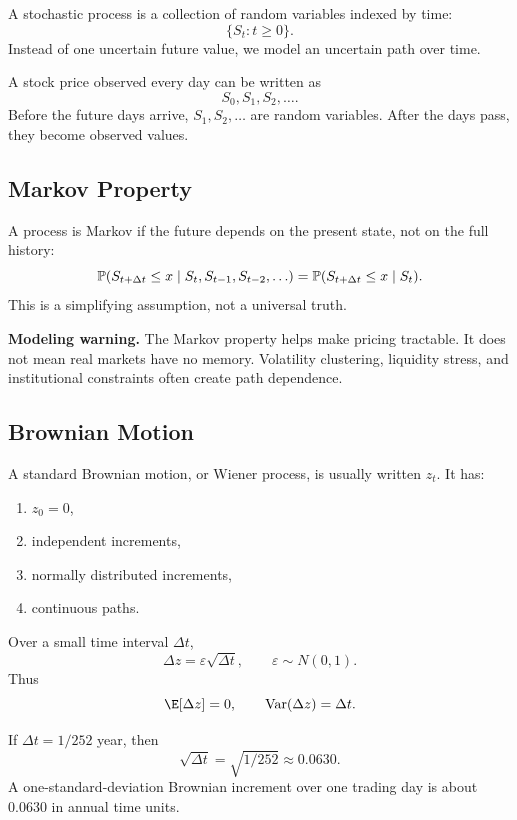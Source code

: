 A stochastic process is a collection of random variables indexed by time:
\[
    \{S_t: t\geq 0\}.
\]
Instead of one uncertain future value, we model an uncertain path over time.

\begin{exmp}
A stock price observed every day can be written as
\[
    S_0,S_1,S_2,\ldots.
\]
Before the future days arrive, $S_1,S_2,\ldots$ are random variables. After the
days pass, they become observed values.
\end{exmp}

\subsection{Markov Property}

A process is Markov if the future depends on the present state, not on the full
history:
\[
    \mathbb{P}(S_{t+\Delta t}\leq x \mid S_t,S_{t-1},S_{t-2},\ldots)
    =
    \mathbb{P}(S_{t+\Delta t}\leq x \mid S_t).
\]
This is a simplifying assumption, not a universal truth.

\begin{boxF}
\textbf{Modeling warning.} The Markov property helps make pricing tractable. It
does not mean real markets have no memory. Volatility clustering, liquidity
stress, and institutional constraints often create path dependence.
\end{boxF}

\subsection{Brownian Motion}

A standard Brownian motion, or Wiener process, is usually written $z_t$. It has:
\begin{enumerate}
    \item $z_0=0$,
    \item independent increments,
    \item normally distributed increments,
    \item continuous paths.
\end{enumerate}
Over a small time interval $\Delta t$,
\[
    \Delta z = \varepsilon\sqrt{\Delta t},
    \qquad
    \varepsilon\sim N(0,1).
\]
Thus
\[
    \E[\Delta z]=0,
    \qquad
    \Var(\Delta z)=\Delta t.
\]

\begin{exmp}
If $\Delta t=1/252$ year, then
\[
    \sqrt{\Delta t}=\sqrt{1/252}\approx 0.0630.
\]
A one-standard-deviation Brownian increment over one trading day is about
0.0630 in annual time units.
\end{exmp}

